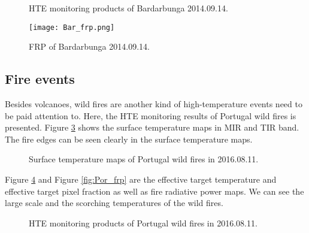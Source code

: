 \begin{figure}[!htbp]
\centering
{}
\hspace{0.1in}
\caption{HTE monitoring products of Bardarbunga 2014.09.14.}
\label{fig:Bar_HTE}
\end{figure}

\begin{figure}[!htbp]
\centering
\texttt{[image: Bar\_frp.png]}
\caption{FRP of Bardarbunga 2014.09.14.}
\label{fig:Bar_frp}
\end{figure}

\subsection{Fire events}
Besides volcanoes, wild fires are another kind of high-temperature events need to be paid attention to. Here, the HTE monitoring results of Portugal wild fires is presented. Figure \ref{fig:Por_sur_tem} shows the surface temperature maps in MIR and TIR band. The fire edges can be seen clearly in the surface temperature maps.\\

\begin{figure}
\centering
{}
\hspace{0.1in}
\caption{Surface temperature maps of Portugal wild fires in 2016.08.11.}
\label{fig:Por_sur_tem}
\end{figure}

\noindent Figure \ref{fig:Por_HTE} and Figure \ref{fig:Por_frp} are the effective target temperature and effective target pixel fraction as well as fire radiative power maps. We can see the large scale and the scorching temperatures of the wild fires.

\begin{figure}[!htbp]
\centering
{}
\hspace{0.1in}
\caption{HTE monitoring products of Portugal wild fires in 2016.08.11.}
\label{fig:Por_HTE}
\end{figure}

